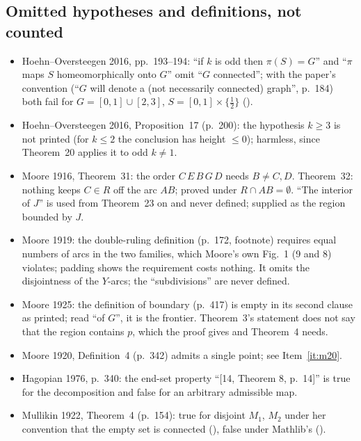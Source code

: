 \documentclass[11pt]{article}
\begin{document}
\subsection*{Omitted hypotheses and definitions, not counted}
\begin{itemize}
\item Hoehn--Oversteegen 2016, pp.~193--194: ``if $k$ is odd then $\pi(S)=G$'' and ``$\pi$ maps $S$
  homeomorphically onto $G$'' omit ``$G$ connected''; with the paper's convention (``$G$ will
  denote a (not necessarily connected) graph'', p.~184) both fail for $G=[0,1]\cup[2,3]$,
  $S=[0,1]\times\{\tfrac12\}$ ().
\item Hoehn--Oversteegen 2016, Proposition~17 (p.~200): the hypothesis $k\ge3$ is not printed (for
  $k\le2$ the conclusion has height $\le0$); harmless, since Theorem~20 applies it to odd $k\ne1$.
\item Moore 1916, Theorem~31: the order $C\,E\,B\,G\,D$ needs $B\ne C,D$. Theorem~32: nothing keeps
  $C\in R$ off the arc $AB$; proved under $R\cap AB=\emptyset$. ``The interior of $J$'' is used from
  Theorem~23 on and never defined; supplied as the region bounded by $J$.
\item Moore 1919: the double-ruling definition (p.~172, footnote) requires equal numbers of arcs in
  the two families, which Moore's own Fig.~1 (9 and 8) violates; padding shows the requirement costs
  nothing. It omits the disjointness of the $Y$-arcs; the ``subdivisions'' are never defined.
\item Moore 1925: the definition of boundary (p.~417) is empty in its second clause as printed;
  read ``of $G$'', it is the frontier. Theorem~3's statement does not say that the region contains
  $p$, which the proof gives and Theorem~4 needs.
\item Moore 1920, Definition~4 (p.~342) admits a single point; see Item~\ref{it:m20}.
\item Hagopian 1976, p.~340: the end-set property ``[14, Theorem 8, p.~14]'' is true for the
  decomposition and false for an arbitrary admissible map.
\item Mullikin 1922, Theorem~4 (p.~154): true for disjoint $M_1$, $M_2$ under her convention that the
  empty set is connected (), false under Mathlib's
  ().
\end{itemize}

\end{document}

